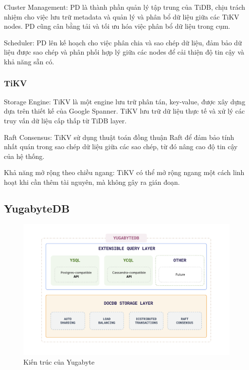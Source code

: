 \documentclass{article}[13pt]
\begin{document}
Cluster Management: PD là thành phần quản lý tập trung của TiDB, chịu trách nhiệm cho việc lưu trữ metadata và quản lý và phân bổ dữ liệu giữa các TiKV nodes. PD cũng cân bằng tải và tối ưu hóa việc phân bổ dữ liệu trong cụm.

Scheduler: PD lên kế hoạch cho việc phân chia và sao chép dữ liệu, đảm bảo dữ liệu được sao chép và phân phối hợp lý giữa các nodes để cải thiện độ tin cậy và khả năng sẵn có.


\subsubsection{TiKV}

Storage Engine: TiKV là một engine lưu trữ phân tán, key-value, được xây dựng dựa trên thiết kế của Google Spanner. TiKV lưu trữ dữ liệu thực tế và xử lý các truy vấn dữ liệu cấp thấp từ TiDB layer.

Raft Consensus: TiKV sử dụng thuật toán đồng thuận Raft để đảm bảo tính nhất quán trong sao chép dữ liệu giữa các sao chép, từ đó nâng cao độ tin cậy của hệ thống.

Khả năng mở rộng theo chiều ngang: TiKV có thể mở rộng ngang một cách linh hoạt khi cần thêm tài nguyên, mà không gây ra gián đoạn.

\subsection{YugabyteDB}

\begin{figure}
    \centering
    \includegraphics[width=0.8\linewidth]{YugaArchitecture.png}
    \caption{Kiến trúc của Yugabyte \protect\footnotemark}
    \label{fig:YugaArchitecture}
\end{figure}
\end{document}
